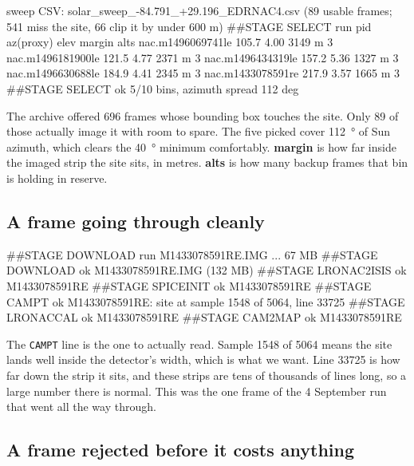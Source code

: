 \documentclass[11pt]{article}
\newcommand{\gr}[1]{\textcolor{termok}{#1}}
\newcommand{\cy}[1]{\textcolor{termcy}{#1}}
\begin{document}
\begin{console}[Selection]
\begin{term}
sweep CSV: solar_sweep_-84.791_+29.196_EDRNAC4.csv
  (\cy{89 usable frames}; 541 miss the site, 66 clip it by under 600 m)
##STAGE SELECT run
pid                    az(proxy)   elev     margin  alts
nac.m1496069741le          105.7   4.00     3149 m     3
nac.m1496181900le          121.5   4.77     2371 m     3
nac.m1496434319le          157.2   5.36     1327 m     3
nac.m1496630688le          184.9   4.41     2345 m     3
nac.m1433078591re          217.9   3.57     1665 m     3
##STAGE SELECT \gr{ok} 5/10 bins, azimuth spread 112 deg
\end{term}
\end{console}

The archive offered 696 frames whose bounding box touches the site. Only 89 of those
actually image it with room to spare. The five picked cover \SI{112}{\degree} of Sun
azimuth, which clears the \SI{40}{\degree} minimum comfortably. \textbf{margin} is how
far inside the imaged strip the site sits, in metres. \textbf{alts} is how many backup
frames that bin is holding in reserve.

\subsection{A frame going through cleanly}

\begin{console}
\begin{term}
##STAGE DOWNLOAD run M1433078591RE.IMG
   ... 67 MB
##STAGE DOWNLOAD \gr{ok} M1433078591RE.IMG (132 MB)
##STAGE LRONAC2ISIS \gr{ok} M1433078591RE
##STAGE SPICEINIT \gr{ok} M1433078591RE
##STAGE CAMPT \gr{ok} M1433078591RE: site at sample 1548 of 5064, line 33725
##STAGE LRONACCAL \gr{ok} M1433078591RE
##STAGE CAM2MAP \gr{ok} M1433078591RE
\end{term}
\end{console}

The \texttt{CAMPT} line is the one to actually read. Sample 1548 of 5064 means the
site lands well inside the detector's width, which is what we want. Line 33725 is how
far down the strip it sits, and these strips are tens of thousands of lines long, so
a large number there is normal. This was the one frame of the 4 September run that
went all the way through.

\subsection{A frame rejected before it costs anything}
\end{document}
